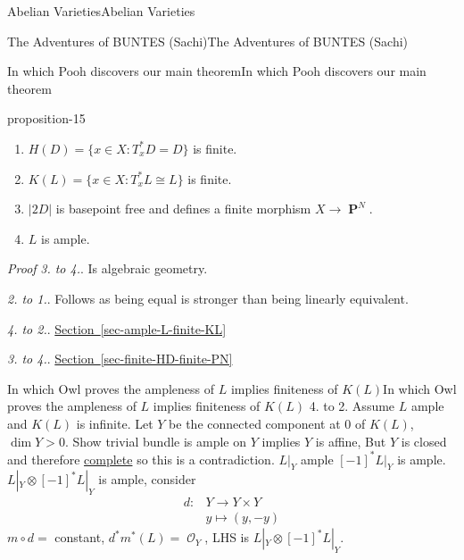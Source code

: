 \documentclass[10pt,]{book}
\makeatletter
\renewcommand*{\proofname}{Proof}
\renewenvironment{proof}[1][\proofname]{\par
  \pushQED{\qed}%
  \normalfont \topsep6\p@\@plus6\p@\relax
  \trivlist
  \item\relax
    {\itshape
    #1\@addpunct{.}}\hspace\labelsep\ignorespaces
}{%
  \popQED\endtrivlist\@endpefalse
}
\numberwithin{equation}{section}
\newcommand{\sheaf}[1]{\operatorname{\mathcal{#1}}}
\newcommand{\lb}{[}
\newcommand{\rb}{]}
\DeclareMathOperator{\PP}{\mathbf{P}}
\newcommand{\gt}{>}
\newcommand{\amp}{&}
\makeatother
\begin{document}
\begin{chapterptx}{Abelian Varieties}{}{Abelian Varieties}{}{}
\begin{sectionptx}{The Adventures of BUNTES (Sachi)}{}{The Adventures of BUNTES (Sachi)}{}{}
\begin{subsectionptx}{In which Pooh discovers our main theorem}{}{In which Pooh discovers our main theorem}{}{}
\begin{proposition}{}{}{proposition-15}
\begin{enumerate}
\item\hypertarget{li-23}{}\(H(D) = \{x\in X: T_x^*D  = D \}\) is finite.%
\item\hypertarget{li-24}{}\(K(L) = \{x\in X: T_x^*L  \cong L \}\) is finite.%
\item\hypertarget{li-25}{}\(|2D|\) is basepoint free and defines a finite morphism \(X\to \PP^N\).%
\item\hypertarget{li-26}{}\(L\) is ample.%
\end{enumerate}
%
\end{proposition}
\begin{proof}\hypertarget{proof-25}{}
\hypertarget{case-1}{}\textit{3. to 4.}. \hypertarget{p-142}{}%
Is algebraic geometry.%
\par\medskip\noindent
\hypertarget{case-2}{}\textit{2. to 1.}. \hypertarget{p-143}{}%
Follows as being equal is stronger than being linearly equivalent.%
\par\medskip\noindent
\hypertarget{case-3}{}\textit{4. to 2.}. \hypertarget{p-144}{}%
\hyperref[sec-ample-L-finite-KL]{Section~\ref{sec-ample-L-finite-KL}}%
\par\medskip\noindent
\hypertarget{case-4}{}\textit{3. to 4.}. \hypertarget{p-145}{}%
\hyperref[sec-finite-HD-finite-PN]{Section~\ref{sec-finite-HD-finite-PN}}%
\end{proof}
\end{subsectionptx}
%
%
\typeout{************************************************}
\typeout{************************************************}
%
\begin{subsectionptx}{In which Owl proves the ampleness of \(L\) implies finiteness of \(K(L)\)}{}{In which Owl proves the ampleness of \(L\) implies finiteness of \(K(L)\)}{}{}\label{sec-ample-L-finite-KL}
\hypertarget{p-146}{}%
4. to 2. Assume \(L\) ample and \(K(L)\) is infinite. Let \(Y\) be the connected component at 0 of \(K(L)\), \(\dim Y \gt 0\). Show trivial bundle is ample on \(Y\) implies \(Y\) is affine, But \(Y\) is closed and therefore \hyperref[def-abelian-complete-var]{complete} so this is a contradiction. \(L|_Y\) ample \(\lb-1\rb^* L|_Y\) is ample. \(L|_Y\otimes \lb -1\rb^*L|_Y\) is ample, consider%
\begin{align*}
d\colon \amp Y \to Y\times Y\\
\amp y\mapsto (y,-y)
\end{align*}
\(m\circ d = \) constant, \(d^*m^* (L) = \sheaf O_Y\), LHS is \(L|_Y \otimes [-1]^* L|_Y\).%

\end{subsectionptx}
\end{sectionptx}
\end{chapterptx}
\end{document}
